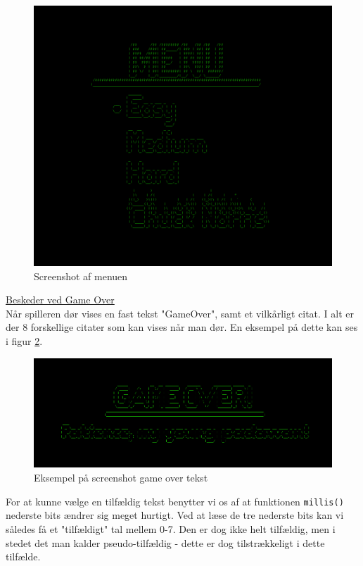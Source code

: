 \begin{figure}[h!]
\centering
\includegraphics[scale=0.25]{figs/screenshots/menu_crop.png}
\caption{Screenshot af menuen}
\label{fig:menu}
\end{figure}

\underline{Beskeder ved Game Over}\\

Når spilleren dør vises en fast tekst "GameOver", samt et vilkårligt citat. I alt er der 8 forskellige citater som kan vises når man dør. En eksempel på dette kan ses i figur \ref{fig:gameover}.

\begin{figure}[h!]
\centering
\includegraphics[scale=0.25]{figs/screenshots/gameover_crop.png}
\caption{Eksempel på screenshot game over tekst}
\label{fig:gameover}
\end{figure}

For at kunne vælge en tilfældig tekst benytter vi os af at funktionen \texttt{millis()} nederste bits ændrer sig meget hurtigt. Ved at læse de tre nederste bits kan vi således få et "tilfældigt" tal mellem 0-7. Den er dog ikke helt tilfældig, men i stedet det man kalder pseudo-tilfældig - dette er dog tilstrækkeligt i dette tilfælde.\\

